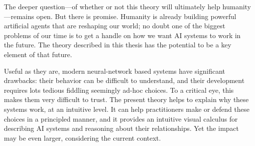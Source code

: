 %
%
%
%
%
%
The deeper question---of whether or not this theory will ultimately help humanity---remains open.
But there is promise. Humanity is already building powerful artificial agents that are reshaping our world; no doubt one of the biggest problems of our time is to get a handle on how we want AI systems to work in the future.  
The theory described in this thesis has the potential to be a key element of that future.

Useful as they are, modern neural-network based systems have significant drawbacks:
their behavior can be difficult to understand, 
and their development requires lots tedious fiddling seemingly ad-hoc choices.
To a critical eye, this makes them very difficult to trust.
The present theory helps to explain why these systems work, at an intuitive level.
It can help practitioners make or defend these choices in a principled manner, and it provides an intuitive visual calculus for describing AI systems and reasoning about their relationships. 
Yet the impact may be even larger, considering the current context. 

